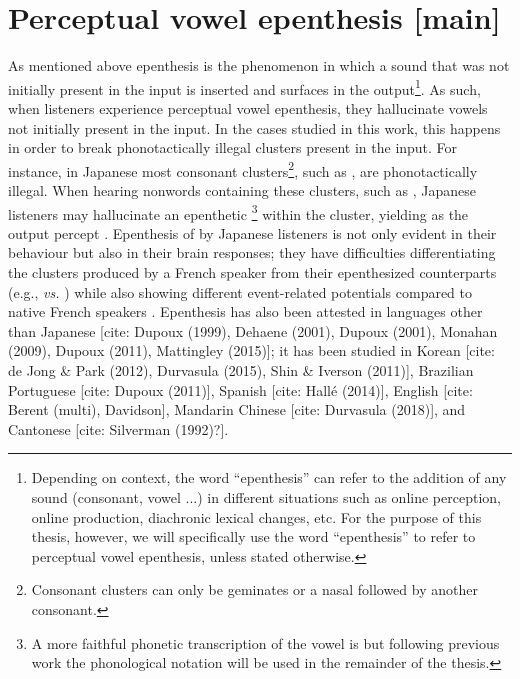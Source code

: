 \section{Perceptual vowel epenthesis [main]}

As mentioned above epenthesis is the phenomenon in which a sound that was not initially present in the input is inserted and surfaces in the output\footnote{Depending on context, the word ``epenthesis'' can refer to the addition of any sound (consonant, vowel ...) in different situations such as online perception, online production, diachronic lexical changes, etc. For the purpose of this thesis, however, we will specifically use the word ``epenthesis'' to refer to perceptual vowel epenthesis, unless stated otherwise.}. As such, when listeners experience perceptual vowel epenthesis, they hallucinate vowels not initially present in the input. In the cases studied in this work, this happens in order to break phonotactically illegal clusters present in the input. For instance, in Japanese most consonant clusters\footnote{Consonant clusters can only be geminates or a nasal followed by another consonant.}, such as , are phonotactically illegal. When hearing nonwords containing these clusters, such as , Japanese listeners may hallucinate an epenthetic \footnote{A more faithful phonetic transcription of the vowel is \textipa{[W]} but following previous work the phonological notation  will be used in the remainder of the thesis.} within the cluster, yielding  as the output percept \cite{dupoux1999}. Epenthesis of  by Japanese listeners is not only evident in their behaviour but also in their brain responses; they have difficulties differentiating the clusters produced by a French speaker from their epenthesized counterparts (e.g.,  \textit{vs.} ) while also showing different event-related potentials compared to native French speakers \cite{dehaene2000}.
Epenthesis has also been attested in languages other than Japanese [cite: Dupoux (1999), Dehaene (2001), Dupoux (2001), Monahan (2009), Dupoux (2011), Mattingley (2015)]; it has been studied in Korean [cite: de Jong \& Park (2012), Durvasula (2015), Shin \& Iverson (2011)], Brazilian Portuguese [cite: Dupoux (2011)], Spanish [cite: Hallé (2014)], English [cite: Berent (multi), Davidson], Mandarin Chinese [cite: Durvasula (2018)], and Cantonese [cite: Silverman (1992)?]. 



